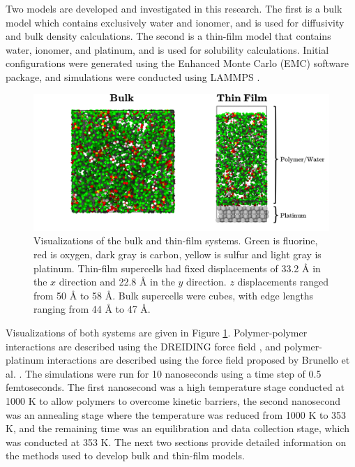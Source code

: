 \documentclass[journal=jacsat,manuscript=article]{achemso}
\begin{document}
Two models are developed and investigated in this research. The first is a bulk model which contains exclusively water and ionomer, and is used for diffusivity and bulk density calculations. The second is a thin-film model that contains water, ionomer, and platinum, and is used for solubility calculations. Initial configurations were generated using the Enhanced Monte Carlo (EMC) software package\cite{in_t_veld_temperature-dependent_2003}, and simulations were conducted using LAMMPS \cite{thompson_lammps_2022}.
\begin{figure}[h]
  \includegraphics[width=.9\linewidth]{systemvis.png}
  \centering
  \caption{Visualizations of the bulk and thin-film systems. Green is fluorine, red is oxygen, dark gray is carbon, yellow is sulfur and light gray is platinum. Thin-film supercells had fixed displacements of 33.2 {\AA} in the $x$ direction and 22.8 {\AA} in the $y$ direction. $z$ displacements ranged from 50 {\AA} to 58 {\AA}. Bulk supercells were cubes, with edge lengths ranging from 44 {\AA} to 47 {\AA}.}
   \label{fig:visualizations}
\end{figure}
Visualizations of both systems are given in Figure \ref{fig:visualizations}. Polymer-polymer interactions are described using the DREIDING force field \cite{mayo_dreiding_1990}, and polymer-platinum interactions are described using the force field proposed by Brunello et al. \cite{brunello_interactions_2016}. The simulations were run for 10 nanoseconds using a time step of 0.5 femtoseconds. The first nanosecond was a high temperature stage conducted at 1000 K to allow polymers to overcome kinetic barriers, the second nanosecond was an annealing stage where the temperature was reduced from 1000 K to 353 K, and the remaining time was an equilibration and data collection stage, which was conducted at 353 K. The next two sections provide detailed information on the methods used to develop bulk and thin-film models. 
\end{document}
